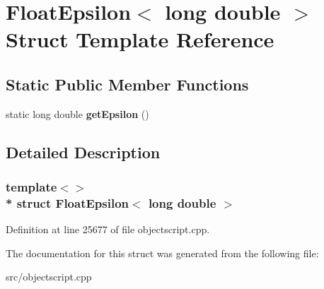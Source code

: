 \hypertarget{struct_float_epsilon_3_01long_01double_01_4}{}\section{Float\+Epsilon$<$ long double $>$ Struct Template Reference}
\label{struct_float_epsilon_3_01long_01double_01_4}
\subsection*{Static Public Member Functions}
\begin{DoxyCompactItemize}
\item 
static long double {\bfseries get\+Epsilon} ()\hypertarget{struct_float_epsilon_3_01long_01double_01_4_a87d34522726025003c4c8f35254b0d0e}{}\label{struct_float_epsilon_3_01long_01double_01_4_a87d34522726025003c4c8f35254b0d0e}

\end{DoxyCompactItemize}


\subsection{Detailed Description}
\subsubsection*{template$<$$>$\\*
struct Float\+Epsilon$<$ long double $>$}



Definition at line 25677 of file objectscript.\+cpp.



The documentation for this struct was generated from the following file\+:\begin{DoxyCompactItemize}
\item 
src/objectscript.\+cpp\end{DoxyCompactItemize}
